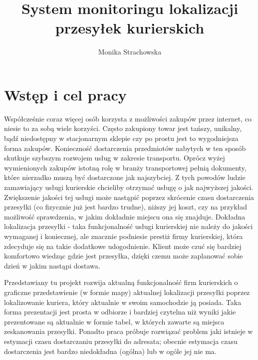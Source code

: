 \documentclass[eng,printmode,oneside]{mgr}
\title{System monitoringu lokalizacji przesyłek kurierskich}
\author{Monika Strachowska}
\begin{document}

\maketitle %


\tableofcontents %

\chapter{Wstęp i cel pracy}

Współcześnie coraz więcej osób korzysta z możliwości zakupów przez internet, co
niesie to za sobą wiele korzyści. Często zakupiony towar jest tańszy, unikalny,
bądź niedostępny w stacjonarnym sklepie czy po prostu jest to wygodniejsza forma
zakupów. Konieczność dostarczenia przedmiotów nabytych w ten sposób skutkuje
szybszym rozwojem usług w zakresie transportu. Oprócz wyżej wymienionych zakupów
istotną rolę w branży transportowej pełnią dokumenty, które nierzadko muszą być
dostarczone jak najszybciej.
Z tych powodów ludzie zamawiający usługi kurierskie chcieliby otrzymać usługę o
jak najwyższej jakości. Zwiększenie jakości tej usługi może nastąpić poprzez
skrócenie czasu dostarczenia przesyłki (co fizycznie już jest bardzo trudne),
niższy jej koszt, czy na przykład możliwość sprawdzenia, w jakim dokładnie
miejscu ona się znajduje. Dokładna lokalizacja przesyłki - taka funkcjonalność
usługi kurierskiej nie należy do jakości wymaganej i koniecznej, ale znacznie podniesie prestiż firmy
kurierskiej, która zdecyduje się na takie dodatkowe udogodnienie. Klient może
czuć się bardziej komfortowo wiedząc gdzie jest przesyłka, dzięki czemu może
zaplanować sobie dzień w jakim nastąpi dostawa.

Przedstawiany tu projekt rozwija aktualną funkcjonalność firm kurierskich o
graficzne przedstawienie (w formie mapy) aktualnej lokalizacji przesyłki
poprzez lokalizowanie kuriera, który aktualnie w swoim samochodzie ją posiada.
Taka forma prezentacji jest prosta w odbiorze i bardziej czytelna niż wyniki
jakie prezentowane są aktualnie w formie tabel, w których zawarte są miejsca
zeskanowania przesyłki. Ponadto praca próbuje rozwiązać problem jaki istnieje w
estymacji czasu dostarczaniu przesyłki do adresata; obecnie estymacja czasu
dostarczenia jest bardzo niedokładna (ogólna) lub w ogóle jej nie ma.
\end{document}
